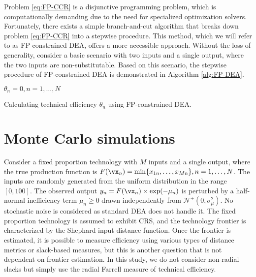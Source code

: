 {Problem \eqref{eq:FP-CCR} is a disjunctive programming problem, which is computationally demanding due to the need for specialized optimization solvers. Fortunately, there exists a simple branch-and-cut algorithm that breaks down problem \eqref{eq:FP-CCR} into a stepwise procedure. This method, which we will refer to as FP-constrained DEA, offers a more accessible approach. Without the loss of generality, consider a basic scenario with two inputs and a single output, where the two inputs are non-substitutable. Based on this scenario, the stepwise procedure of FP-constrained DEA is demonstrated in Algorithm \ref{alg:FP-DEA}.

\vspace{.45em}
\begin{algorithm}[H]\label{alg:FP-DEA} 
  $\theta_{n} = 0, n = 1, \ldots, N$\;
\caption{Calculating technical efficiency $\theta_{n}$ using FP-constrained DEA.}
\end{algorithm}
\vspace{1em}
\section{Monte Carlo simulations}\label{sec:mc-sim}
Consider a fixed proportion technology with $M$ inputs and a single output, where the true production function is $F(\vx_n) = \min\{x_{1n}, \ldots, x_{Mn}\}, n = 1, \ldots, N$. The inputs are randomly generated from the uniform distribution in the range $[0, 100]$. The observed output $y_n = F(\vx_n)\times \exp(-\mu_n)$ is perturbed by a half-normal inefficiency term $\mu_n\geq 0$ drawn independently from $\mathcal{N}^+(0,\sigma_\mu^2)$. No stochastic noise is considered as standard DEA does not handle it. The fixed proportion technology is assumed to exhibit CRS, and the technology frontier is characterized by the Shephard input distance function. Once the frontier is estimated, it is possible to measure efficiency using various types of distance metrics or slack-based measures, but this is another question that is not dependent on frontier estimation. In this study, we do not consider non-radial slacks but simply use the radial Farrell measure of technical efficiency.

}

